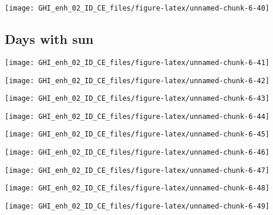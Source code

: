 \documentclass[
  10pt,
  a4paper,oneside]{article}
\begin{document}
\begin{center}\texttt{[image: GHI\_enh\_02\_ID\_CE\_files/figure-latex/unnamed-chunk-6-40]} \end{center}

\hypertarget{days-with-sun}{%
\subsection{Days with sun}\label{days-with-sun}}

\begin{center}\texttt{[image: GHI\_enh\_02\_ID\_CE\_files/figure-latex/unnamed-chunk-6-41]} \end{center}

\begin{center}\texttt{[image: GHI\_enh\_02\_ID\_CE\_files/figure-latex/unnamed-chunk-6-42]} \end{center}

\begin{center}\texttt{[image: GHI\_enh\_02\_ID\_CE\_files/figure-latex/unnamed-chunk-6-43]} \end{center}

\begin{center}\texttt{[image: GHI\_enh\_02\_ID\_CE\_files/figure-latex/unnamed-chunk-6-44]} \end{center}

\begin{center}\texttt{[image: GHI\_enh\_02\_ID\_CE\_files/figure-latex/unnamed-chunk-6-45]} \end{center}

\begin{center}\texttt{[image: GHI\_enh\_02\_ID\_CE\_files/figure-latex/unnamed-chunk-6-46]} \end{center}

\begin{center}\texttt{[image: GHI\_enh\_02\_ID\_CE\_files/figure-latex/unnamed-chunk-6-47]} \end{center}

\begin{center}\texttt{[image: GHI\_enh\_02\_ID\_CE\_files/figure-latex/unnamed-chunk-6-48]} \end{center}

\begin{center}\texttt{[image: GHI\_enh\_02\_ID\_CE\_files/figure-latex/unnamed-chunk-6-49]} \end{center}
\end{document}
